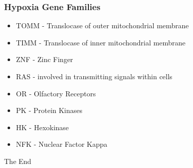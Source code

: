 \documentclass[14pt]{beamer}
\begin{document}
\begin{frame}
\frametitle{Hypoxia Gene Families}
\begin{itemize}
	\item TOMM - Translocase of outer mitochondrial membrane
	\item TIMM - Translocase of inner mitochondrial membrane
	\item ZNF - Zinc Finger
	\item RAS - involved in transmitting signals within cells
	\item OR - Olfactory Receptors
	\item PK - Protein Kinases
	\item HK - Hexokinase
	\item NFK - Nuclear Factor Kappa
\end{itemize}
\end{frame}


\begin{frame}
\Huge{\centerline{The End}}
\end{frame}

\end{document}
